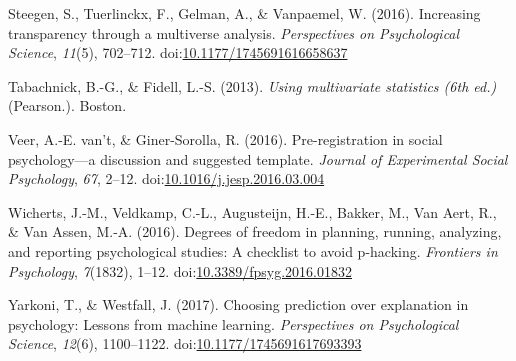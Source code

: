 \documentclass[man,floatsintext]{apa6}
\begin{document}
\leavevmode\hypertarget{ref-Steegen_et_al_2016}{}%
Steegen, S., Tuerlinckx, F., Gelman, A., \& Vanpaemel, W. (2016). Increasing transparency through a multiverse analysis. \emph{Perspectives on Psychological Science}, \emph{11}(5), 702--712. doi:\href{https://doi.org/10.1177/1745691616658637}{10.1177/1745691616658637}

\leavevmode\hypertarget{ref-Tabachnick_Fidell_2013}{}%
Tabachnick, B.-G., \& Fidell, L.-S. (2013). \emph{Using multivariate statistics (6th ed.)} (Pearson.). Boston.

\leavevmode\hypertarget{ref-vantveer_2016}{}%
Veer, A.-E. van't, \& Giner-Sorolla, R. (2016). Pre-registration in social psychology---a discussion and suggested template. \emph{Journal of Experimental Social Psychology}, \emph{67}, 2--12. doi:\href{https://doi.org/10.1016/j.jesp.2016.03.004}{10.1016/j.jesp.2016.03.004}

\leavevmode\hypertarget{ref-Wicherts_et_al_2016}{}%
Wicherts, J.-M., Veldkamp, C.-L., Augusteijn, H.-E., Bakker, M., Van Aert, R., \& Van Assen, M.-A. (2016). Degrees of freedom in planning, running, analyzing, and reporting psychological studies: A checklist to avoid p-hacking. \emph{Frontiers in Psychology}, \emph{7}(1832), 1--12. doi:\href{https://doi.org/10.3389/fpsyg.2016.01832}{10.3389/fpsyg.2016.01832}

\leavevmode\hypertarget{ref-Yarkoni_Westfall_2017}{}%
Yarkoni, T., \& Westfall, J. (2017). Choosing prediction over explanation in psychology: Lessons from machine learning. \emph{Perspectives on Psychological Science}, \emph{12}(6), 1100--1122. doi:\href{https://doi.org/10.1177/1745691617693393}{10.1177/1745691617693393}
\end{document}
